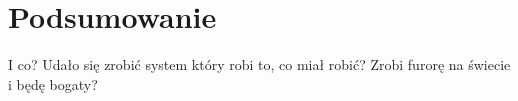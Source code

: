 \chapter{Podsumowanie}
I co? Udało się zrobić system który robi to, co miał robić? Zrobi furorę na świecie i będę bogaty?